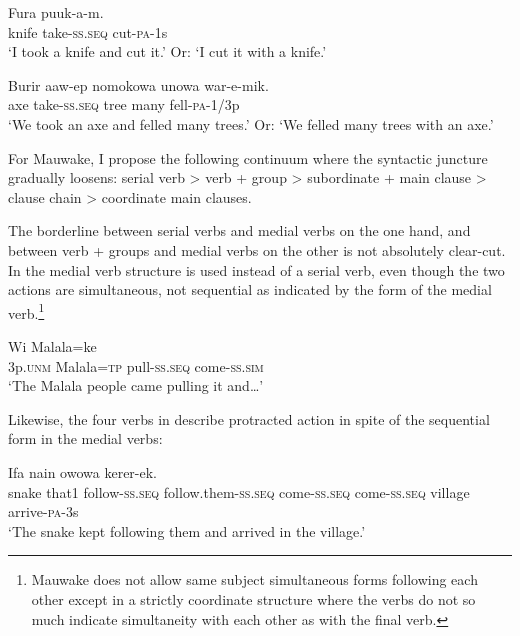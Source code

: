 \ea%
\label{ex:3:x387}
\gll Fura  puuk-a-m. \\
knife take-\textsc{ss}.\textsc{seq} cut-\textsc{pa}-1s \\
\glt`I took a knife and cut it.' Or: `I cut it with a knife.'
\z

\ea%
\label{ex:3:x388}
\gll Burir aaw-ep nomokowa unowa war-e-mik. \\
axe take-\textsc{ss}.\textsc{seq} tree many fell-\textsc{pa}-1/3p \\
\glt`We took an axe and felled many trees.' Or: `We felled many trees with an axe.'
\z

For Mauwake, I propose the following continuum where the syntactic juncture gradually loosens: serial verb {{\textgreater}} verb +  group {{\textgreater}} subordinate + main clause {{\textgreater}} clause chain {{\textgreater}} coordinate main clauses.

The borderline between serial verbs and medial verbs on the one hand, and between verb +  groups and medial verbs on the other is not absolutely clear-cut. In  the medial verb structure is used instead of a serial verb, even though the two actions are simultaneous, not sequential as indicated by the form of the medial verb.\footnote{Mauwake does not allow same subject simultaneous forms following each other except in a strictly coordinate structure where the verbs do not so much indicate simultaneity with each other as with the final verb.} 

\ea%
\label{ex:3:x389}
\gll Wi Malala=ke   \\
3p.\textsc{unm} Malala=\textsc{tp} pull-\textsc{ss}.\textsc{seq} come-\textsc{ss}.\textsc{sim} \\
\glt`The Malala people came pulling it and{\dots}'
\z

Likewise, the four verbs in  describe  protracted action in spite of the sequential form in the medial verbs:

\ea%
\label{ex:3:x390}
\gll Ifa nain     owowa kerer-ek.\\
snake that1 follow-\textsc{ss}.\textsc{seq} follow.them-\textsc{ss}.\textsc{seq} come-\textsc{ss}.\textsc{seq} come-\textsc{ss}.\textsc{seq} village arrive-\textsc{pa}-3s\\
\glt`The snake kept following them and arrived in the village.'
\z

